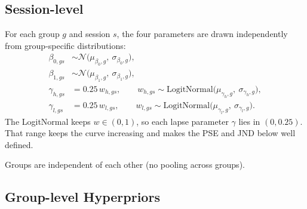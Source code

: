 \documentclass[11pt]{article}
\begin{document}
\subsection{Session-level}

For each group $g$ and session $s$, the four parameters are drawn independently
from group-specific distributions:
\begin{align*}
  \beta_{0,gs} &\sim \mathcal{N}\big(\mu_{\beta_0,g},\ \sigma_{\beta_0,g}\big), \\
  \beta_{1,gs} &\sim \mathcal{N}\big(\mu_{\beta_1,g},\ \sigma_{\beta_1,g}\big), \\
  \gamma_{h,gs} &= 0.25\, w_{h,gs}, \qquad
      w_{h,gs} \sim \text{LogitNormal}\big(\mu_{\gamma_h,g},\ \sigma_{\gamma_h,g}\big), \\
  \gamma_{l,gs} &= 0.25\, w_{l,gs}, \qquad
      w_{l,gs} \sim \text{LogitNormal}\big(\mu_{\gamma_l,g},\ \sigma_{\gamma_l,g}\big).
\end{align*}
The LogitNormal keeps $w \in (0,1)$, so each lapse parameter $\gamma$ lies in
$(0, 0.25)$. That range keeps the curve increasing and makes the PSE and JND
below well defined.

Groups are independent of each other (no pooling across groups).

\subsection{Group-level Hyperpriors}
\end{document}
